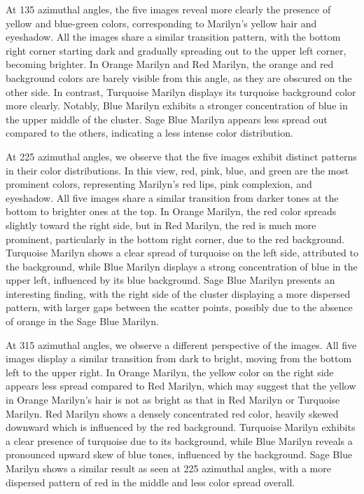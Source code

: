 \documentclass{article}
\begin{document}
At 135 azimuthal angles, the five images reveal more clearly the presence of yellow and blue-green colors, corresponding to Marilyn’s yellow hair and eyeshadow. All the images share a similar transition pattern, with the bottom right corner starting dark and gradually spreading out to the upper left corner, becoming brighter. In Orange Marilyn and Red Marilyn, the orange and red background colors are barely visible from this angle, as they are obscured on the other side. In contrast, Turquoise Marilyn displays its turquoise background color more clearly. Notably, Blue Marilyn exhibits a stronger concentration of blue in the upper middle of the cluster. Sage Blue Marilyn appears less spread out compared to the others, indicating a less intense color distribution.

At 225 azimuthal angles, we observe that the five images exhibit distinct patterns in their color distributions. In this view, red, pink, blue, and green are the most prominent colors, representing Marilyn’s red lips, pink complexion, and eyeshadow. All five images share a similar transition from darker tones at the bottom to brighter ones at the top. In Orange Marilyn, the red color spreads slightly toward the right side, but in Red Marilyn, the red is much more prominent, particularly in the bottom right corner, due to the red background. Turquoise Marilyn shows a clear spread of turquoise on the left side, attributed to the background, while Blue Marilyn displays a strong concentration of blue in the upper left, influenced by its blue background. Sage Blue Marilyn presents an interesting finding, with the right side of the cluster displaying a more dispersed pattern, with larger gaps between the scatter points, possibly due to the absence of orange in the Sage Blue Marilyn.

At 315 azimuthal angles, we observe a different perspective of the images. All five images display a similar transition from dark to bright, moving from the bottom left to the upper right. In Orange Marilyn, the yellow color on the right side appears less spread compared to Red Marilyn, which may suggest that the yellow in Orange Marilyn’s hair is not as bright as that in Red Marilyn or Turquoise Marilyn. Red Marilyn shows a densely concentrated red color, heavily skewed downward which is influenced by the red background. Turquoise Marilyn exhibits a clear presence of turquoise due to its background, while Blue Marilyn reveals a pronounced upward skew of blue tones, influenced by the background. Sage Blue Marilyn shows a similar result as seen at 225 azimuthal angles, with a more dispersed pattern of red in the middle and less color spread overall.
\end{document}
